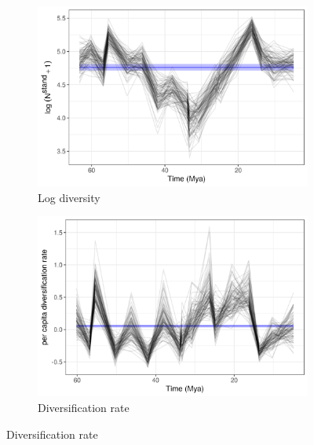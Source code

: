 \documentclass[12pt,letterpaper]{article}
\begin{document}
\begin{figure}[ht]
  \begin{subfigure}[b]{0.45\textwidth}
    \includegraphics[width=\textwidth,height=0.5\textheight,keepaspectratio=true]{figure/log_diversity}
    \caption{Log diversity}
    \label{fig:diversity_est}
  \end{subfigure}
  \begin{subfigure}[b]{0.45\textwidth}
    \includegraphics[width=\textwidth,height=0.5\textheight,keepaspectratio=true]{figure/div_rate}
    \caption{Diversification rate}
    \label{fig:diversity_rate}
  \end{subfigure}

\end{figure}
\end{document}
